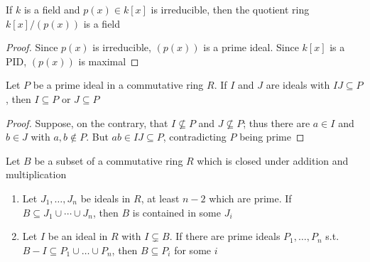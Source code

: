 \documentclass[11pt]{article}
\begin{document}
\begin{corollary}[]
If \(k\) is a field and \(p(x)\in k[x]\) is irreducible, then the quotient ring 
\(k[x]/(p(x))\) is a field
\end{corollary}

\begin{proof}
Since \(p(x)\) is irreducible, \((p(x))\) is a prime ideal. Since \(k[x]\) is
a PID, \((p(x))\) is maximal
\end{proof}

\begin{proposition}[]
Let \(P\) be a prime ideal in a commutative ring \(R\). If \(I\) and \(J\) are ideals
with \(IJ\subseteq P\), then \(I\subseteq P\) or \(J\subseteq P\)
\end{proposition}

\begin{proof}
Suppose, on the contrary, that \(I\not\subseteq P\) and \(J\not\subseteq P\);
thus there are \(a\in I\) and \(b\in J\) with \(a,b\not\in P\). But 
\(ab\in IJ\subseteq P\), contradicting \(P\) being prime
\end{proof}

\begin{proposition}[]
Let \(B\) be a subset of a commutative ring \(R\) which is closed under addition
and multiplication
\begin{enumerate}
\item Let \(J_1,\dots,J_n\) be ideals in \(R\), at least \(n-2\) which are prime.
If \(B\subseteq J_1\cup\cdots\cup J_n\), then \(B\) is contained in some
\(J_i\)
\item Let \(I\) be an ideal in \(R\) with \(I\subsetneq B\). If there are prime
ideals \(P_1,\dots,P_n\) s.t. \(B-I\subseteq P_1\cup\dots\cup P_n\), then 
\(B\subseteq P_i\) for some \(i\)
\end{enumerate}
\end{proposition}
\end{document}
